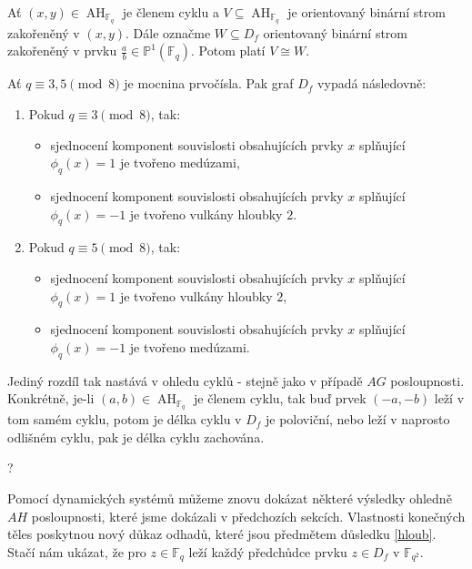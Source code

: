 \documentclass[12pt]{report}
\DeclareMathOperator{\AH}{AH}
\begin{document}
\begin{dusledek}\label{co}
Ať $(x,y) \in \AH_{\mathbb{F}_q}$ je členem cyklu a $V \subseteq \AH_{\mathbb{F}_q}$ je orientovaný binární strom zakořeněný v $(x,y)$. Dále označme $W \subseteq D_f$ orientovaný binární strom zakořeněný v prvku $\frac{a}{b} \in \mathbb{P}^{1}(\mathbb{F}_q)$. Potom platí $V \cong W$.
\end{dusledek}
\begin{dusledek}
Ať $q \equiv 3,5 \pmod{8}$ je mocnina prvočísla. Pak graf $D_f$ vypadá následovně:
\begin{enumerate}
\item Pokud $q \equiv 3 \pmod{8}$, tak:
\begin{itemize}
\item sjednocení komponent souvislosti obsahujících prvky $x$ splňující $\phi_q(x) = 1$ je tvořeno medúzami,
\item sjednocení komponent souvislosti obsahujících prvky $x$ splňující $\phi_q(x) = -1$ je tvořeno vulkány hloubky $2$.
\end{itemize}
\item Pokud $q \equiv 5 \pmod{8}$, tak:
\begin{itemize}
\item sjednocení komponent souvislosti obsahujících prvky $x$ splňující $\phi_q(x) = 1$ je tvořeno vulkány hloubky $2$,
\item sjednocení komponent souvislosti obsahujících prvky $x$ splňující $\phi_q(x) = -1$ je tvořeno medúzami.
\end{itemize}
\end{enumerate}
\end{dusledek}

 Jediný rozdíl tak nastává v ohledu cyklů - stejně jako v případě $AG$ posloupnosti. Konkrétně, je-li $(a,b) \in \AH_{\mathbb{F}_q}$ je členem cyklu, tak buď prvek $(-a,-b)$ leží v tom samém cyklu, potom je délka cyklu v $D_f$ je poloviční, nebo leží v naprosto odlišném cyklu, pak je délka cyklu zachována.

\begin{poznamka}
?
\end{poznamka}

Pomocí dynamických systémů můžeme znovu dokázat některé výsledky ohledně $AH$ posloupnosti, které jsme dokázali v předchozích sekcích. Vlastnosti konečných těles poskytnou nový důkaz odhadů, které jsou předmětem důsledku \ref{hloub}. Stačí nám ukázat, že pro $z \in \mathbb{F}_q$ leží každý předchůdce prvku $z \in D_f$ v $\mathbb{F}_{q^2}$. 
\end{document}
